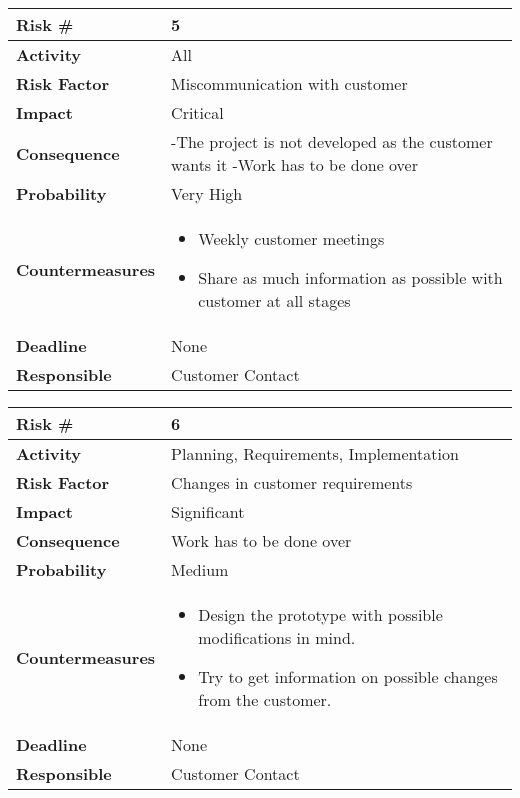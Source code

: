 \begin{tabularx}{\textwidth}{ | l | X | }
\hline
\textbf{Risk \#} & 5 \\ \hline
\textbf{Activity} & All \\ \hline
\textbf{Risk Factor} & Miscommunication with customer \\ \hline
\textbf{Impact} & Critical \\ \hline

\textbf{Consequence} & -The project is not developed as the customer wants it
-Work has to be done over \\ \hline
\textbf{Probability} & Very High \\ \hline
\textbf{Countermeasures} & \begin{itemize}
  \item Weekly customer meetings
  \item Share as much information as possible with customer at all stages
\end{itemize}  \\ \hline
\textbf{Deadline} &  None \\ \hline
\textbf{Responsible} & Customer Contact \\ \hline
\end{tabularx}

\begin{tabularx}{\textwidth}{ | l | X | }
\hline
\textbf{Risk \#} & 6 \\ \hline
\textbf{Activity} & Planning, Requirements, Implementation \\ \hline
\textbf{Risk Factor} & Changes in customer requirements \\ \hline
\textbf{Impact} & Significant \\ \hline
\textbf{Consequence} & Work has to be done over  \\ \hline
\textbf{Probability} & Medium \\ \hline
\textbf{Countermeasures} & \begin{itemize}
  \item Design the prototype with possible modifications in mind.
  \item Try to get information on possible changes from the customer.
\end{itemize}  \\ \hline
\textbf{Deadline} &  None \\ \hline
\textbf{Responsible} & Customer Contact \\ \hline
\end{tabularx}


